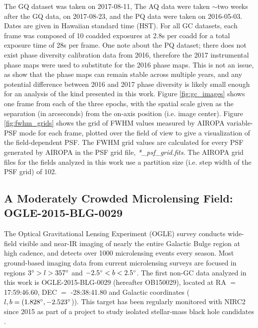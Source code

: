 \documentclass[]{spie}  %
\begin{document}
The GQ dataset was taken on 2017-08-11, The AQ data were taken $\sim$two weeks after the GQ data, on 2017-08-23, and the PQ data were taken on 2016-05-03. Dates are given in Hawaiian standard time (HST). For all GC datasets, each frame was composed of 10 coadded exposures at 2.8s per coadd for a total exposure time of 28s per frame. One note about the PQ dataset; there does not exist phase diversity calibration data from 2016, therefore the 2017 instrumental phase maps were used to substitute for the 2016 phase maps. This is not an issue, as \cite{Ciurlo:inprep} show that the phase maps can remain stable across multiple years, and any potential difference between 2016 and 2017 phase diversity is likely small enough for an analysis of the kind presented in this work. Figure \ref{fig:gc_images} shows one frame from each of the three epochs, with the spatial scale given as the separation (in arcseconds) from the on-axis position (i.e. image center). Figure \ref{fig:fwhm_grids} shows the grid of FWHM values measured by AIROPA variable-PSF mode for each frame, plotted over the field of view to give a visualization of the field-dependent PSF. The FWHM grid values are calculated for every PSF generated by AIROPA in the PSF grid file, \textit{*\_psf\_grid.fits}. The AIROPA grid files for the fields analyzed in this work use a partition size (i.e. step width of the PSF grid) of 102. 


 
\subsection{A Moderately Crowded Microlensing Field: OGLE-2015-BLG-0029} \label{sec:ogle-data}
The Optical Gravitational Lensing Experiment (OGLE) survey \cite{udalski:1992a} conducts wide-field visible and near-IR imaging of nearly the entire Galactic Bulge region at high cadence, and detects over 1000 microlensing events every season. Most ground-based imaging data from current microlensing surveys are focused in regions $3\degree > l > 357\degree$ and $-2.5\degree < b < 2.5\degree$. The first non-GC data analyzed in this work is OGLE-2015-BLG-0029 (hereafter OB150029), located at RA $=$ 17:59:46.60, DEC $=$ -28:38:41.80 and Galactic coordinates ($l,b = (1.828\degree, -2.523\degree$)). This target has been regularly monitored with NIRC2 since 2015 as part of a project to study isolated stellar-mass black hole candidates \citep{lu:inprep}.
\end{document}
